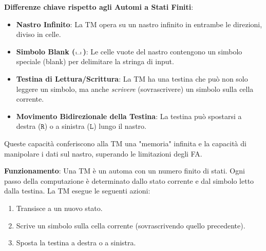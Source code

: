 \documentclass[a4paper]{article}
\theoremstyle{definition} %
\newcommand{\blankS}{\ensuremath{\raisebox{-0.15ex}{\scalebox{1.3}[0.7]{$\sqcup$}}\mkern2mu}}
\begin{document}
\textbf{Differenze chiave rispetto agli Automi a Stati Finiti}:
\begin{itemize}
    \item \textbf{Nastro Infinito}: La TM opera su un nastro infinito in entrambe le direzioni, diviso in celle.
    \item \textbf{Simbolo Blank ($\blankS$)}: Le celle vuote del nastro contengono un simbolo speciale (blank) per delimitare la stringa di input.
    \item \textbf{Testina di Lettura/Scrittura}: La TM ha una testina che può non solo leggere un simbolo, ma anche \emph{scrivere} (sovrascrivere) un simbolo sulla cella corrente.
    \item \textbf{Movimento Bidirezionale della Testina}: La testina può spostarsi a destra ($\texttt{R}$) o a sinistra ($\texttt{L}$) lungo il nastro.
\end{itemize}
Queste capacità conferiscono alla TM una "memoria" infinita e la capacità di manipolare i dati sul nastro, superando le limitazioni degli FA.

\textbf{Funzionamento}:
Una TM è un automa con un numero finito di stati. Ogni passo della computazione è determinato dallo stato corrente e dal simbolo letto dalla testina. La TM esegue le seguenti azioni:
\begin{enumerate}
    \item Transisce a un nuovo stato.
    \item Scrive un simbolo sulla cella corrente (sovrascrivendo quello precedente).
    \item Sposta la testina a destra o a sinistra.
\end{enumerate}
\end{document}
